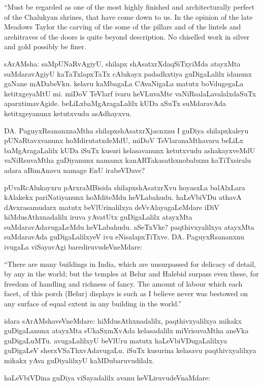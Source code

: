\documentclass[11pt,a4size]{article}
\begin{document}
{
\rm
``Must be regarded as one of the most highly finished and
architecturally perfect of the Chalukyan shrines, that have come down
to us. In the opinion of the late Meadows Taylor the carving of the
some of the pillars and of the lintels and arehitraves of the doors is
quite beyond description. No chiselled work in silver and gold
possibly be finer.}

sArAMsha: saMpUNaRvAgiyU, shilapx shAsatxrXdaqSiTxyiMda atayxMta
suMdaravAgiyU kaTaTxlapxTaTx cAlukayx padadhxtiya guDigaLalilx idanunx
gaNane mADabeVku. kelavu kaMbagaLa CAvaNigaLa matutx boVdugegaLa
ketitxgeyaMtU mi. miDoV TeVlarf ivaru heVLuvaMte
vaNiRsalaLavalalxdaSuTx aparxtimavAgide. beLiLxbaMgAragaLalilx kUDa
aSuTx suMdaravAda ketitxgeyanunx ketutxvudu asAdhayxvu.

DA. PaguyxRsananxnaMtha shilapxshAsatxrXjacnxnu I guDiya shilapxkaleyu
pUNaRtavxvanunx hoMdirutatxdeMdU, miDoV TeVlaranaMthavaru beLiLx
baMgAragaLalilx kUDa iSuTx kusuri kelasavanunx ketutxvudu
ashakayxveMdU vaNiRsuvaMtha guDiyanunx namamx kanARTakasathxnobabxnu
kaTiTxsiralu adara aBimAnavu namage EnU irabeVDave?

pUvaRcAlukayxru pArxraMBisida shilapxshAsatxrXvu hoyasxLa balAlxLara
kAlakekx pariNatiyanunx hoMditeMdu heVLabahudu. haLeVbiVDu athavA
dAvxrasamudarx matutx beVlUrinalilxya deVvAlayagaLeMdare iDiV
hiMdusAthxnadalilx iruva yAvatUtx guDigaLalilx atayxMta
suMdaravAdavugaLeMdu heVLabahudu. aSeTxVke? paqthivxyalilxya atayxMta
suMdaravAda guDigaLalilxyeV ivu eNisalapxTiTxve. DA. PaguyxRsananxnu
ivugaLa viSayavAgi barediruvudeVneMdare:

{
\rm
``There are many buildings in India, which are unsurpassed for
delicacy of detail, by any in the world; but the temples at Belur and
Halebid surpass even these, for freedom of handling and richness of
fancy. The amount of labour which each facet, of this porch (Belur)
displays is such as I believe never was bestowed on any surface of
equal extent in any building in the world.''}

idara sArAMshaveVneMdare: hiMdusAthxnadalilx, paqthivxyalilxya mikakx
guDigaLanunx atayxMta sUkaSxmXvAda kelasadalilx miVrisuvaMtha aneVka
guDigaLuMTu. avugaLalilxyU beVlUru matutx haLeVbiVDugaLalilxya
guDigaLeV sherxVSaThxvAdavugaLu. iSuTx kusurina kelasavu
paqthivxyalilxya mikakx yAva guDiyalilxyU kaMDubaruvudilalx.

haLeVbiVDina guDiya viSayadalilx avanu heVLiruvudeVnaMdare:
\end{document}
